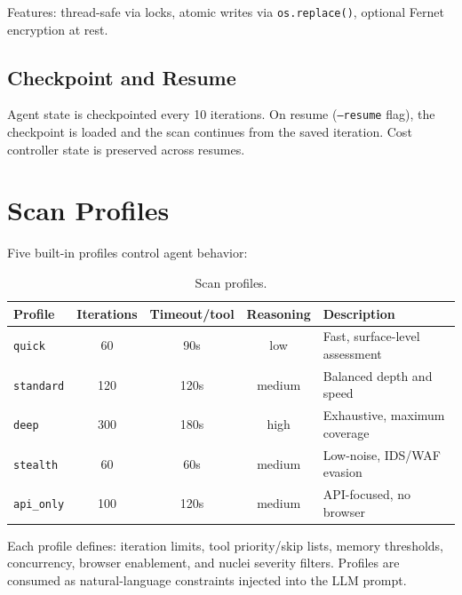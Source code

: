 \documentclass[12pt,a4paper]{report}
\begin{document}
Features: thread-safe via locks, atomic writes via \texttt{os.replace()}, optional Fernet encryption at rest.

\section{Checkpoint and Resume}

Agent state is checkpointed every 10 iterations. On resume (\texttt{--resume} flag), the checkpoint is loaded and the scan continues from the saved iteration. Cost controller state is preserved across resumes.


\chapter{Scan Profiles}

Five built-in profiles control agent behavior:

\begin{table}[H]
\centering
\caption{Scan profiles.}
\begin{tabular}{lcccl}
\toprule
\textbf{Profile} & \textbf{Iterations} & \textbf{Timeout/tool} & \textbf{Reasoning} & \textbf{Description} \\
\midrule
\texttt{quick}    & 60  & 90s  & low    & Fast, surface-level assessment \\
\texttt{standard} & 120 & 120s & medium & Balanced depth and speed \\
\texttt{deep}     & 300 & 180s & high   & Exhaustive, maximum coverage \\
\texttt{stealth}  & 60  & 60s  & medium & Low-noise, IDS/WAF evasion \\
\texttt{api\_only} & 100 & 120s & medium & API-focused, no browser \\
\bottomrule
\end{tabular}
\end{table}

Each profile defines: iteration limits, tool priority/skip lists, memory thresholds, concurrency, browser enablement, and nuclei severity filters. Profiles are consumed as natural-language constraints injected into the LLM prompt.


\end{document}
